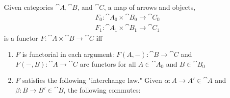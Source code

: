 \documentclass{article}
\begin{document}
\begin{lemma}
	Given categories $\cat A, \cat B$, and $\cat C$, a map of arrows and objects,
	\begin{align*}
		F_0 : \cat A_0 \times \cat B_0 \to \cat C_0 \\
		F_1 : \cat A_1 \times \cat B_1 \to \cat C_1
	\end{align*}
	is a functor $F:\cat A \times \cat B \to \cat C$ iff
	\begin{enumerate}
		\item $F$ is functorial in each argument: $F(A, -):\cat B \to \cat C$ and
		      $F(-, B):\cat A \to \cat C$ are functors for all $A\in\cat A_0$ and $B\in \cat B_0$
		\item $F$ satisfies the following "interchange law." Given $\alpha: A\to A'\in \cat A$ and
		      $\beta: B\to B'\in \cat B$, the following commutes:
		      \begin{center}
		      \end{center}
	\end{enumerate}
\end{lemma}
\end{document}

